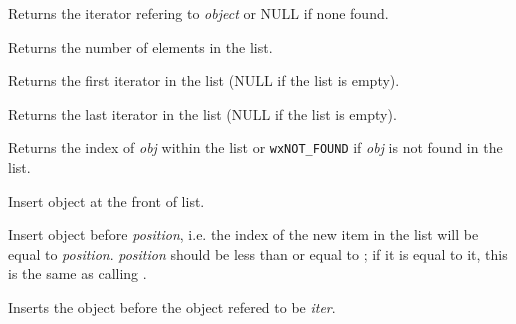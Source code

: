 
Returns the iterator refering to {\it object} or NULL if none found.

\label{wxlistgetcount}


Returns the number of elements in the list.

\label{wxlistgetfirst}


Returns the first iterator in the list (NULL if the list is empty).

\label{wxlistgetlast}


Returns the last iterator in the list (NULL if the list is empty).

\label{wxlistindexof}


Returns the index of {\it obj} within the list or {\tt wxNOT\_FOUND} if
{\it obj} is not found in the list.

\label{wxlistinsert}


Insert object at the front of list.


Insert object before {\it position}, i.e. the index of the new item in the
list will be equal to {\it position}. {\it position} should be less than or
equal to ; if it is equal to it, this is the
same as calling .


Inserts the object before the object refered to be {\it iter}.

\label{wxlistisempty}


